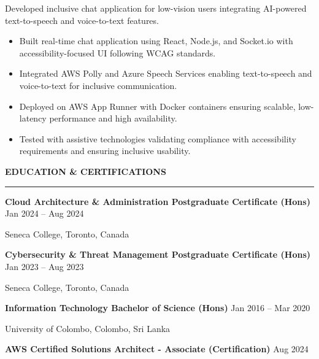 \documentclass[10pt,letterpaper]{article}
\begin{document}
\vspace{-1pt}

Developed inclusive chat application for low-vision users integrating AI-powered text-to-speech and voice-to-text features.
\vspace{-1pt}
\begin{itemize}
\item Built real-time chat application using React, Node.js, and Socket.io with accessibility-focused UI following WCAG standards.
\item Integrated AWS Polly and Azure Speech Services enabling text-to-speech and voice-to-text for inclusive communication.
\item Deployed on AWS App Runner with Docker containers ensuring scalable, low-latency performance and high availability.
\item Tested with assistive technologies validating compliance with accessibility requirements and ensuring inclusive usability.
\end{itemize}

\vspace{6pt}

\textbf{EDUCATION \& CERTIFICATIONS}\\[-8pt]
\noindent\rule{\textwidth}{1pt}

\vspace{-2pt}

\textbf{Cloud Architecture \& Administration Postgraduate Certificate (Hons)} \hfill Jan 2024 -- Aug 2024

Seneca College, Toronto, Canada

\textbf{Cybersecurity \& Threat Management Postgraduate Certificate (Hons)} \hfill Jan 2023 -- Aug 2023

Seneca College, Toronto, Canada

\textbf{Information Technology Bachelor of Science (Hons)} \hfill Jan 2016 -- Mar 2020

University of Colombo, Colombo, Sri Lanka

\textbf{AWS Certified Solutions Architect - Associate (Certification)} \hfill Aug 2024
\end{document}
